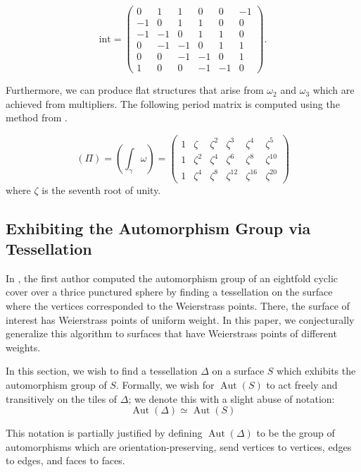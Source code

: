\documentclass[12pt,reqno]{amsart}
\DeclareMathOperator{\Aut}{Aut}
\theoremstyle{definition}
\theoremstyle{remark}
\begin{document}
$$\textrm{int} = \begin{pmatrix}
 0 & 1 & 1 & 0 & 0 & -1 \\
 -1 & 0 & 1 & 1 & 0 & 0 \\
 -1 & -1 & 0 & 1 & 1 & 0 \\
 0 & -1 & -1 & 0 & 1 & 1 \\
 0 & 0 & -1 & -1 & 0 & 1 \\
 1 & 0 & 0 & -1 & -1 & 0 
\end{pmatrix}.$$

Furthermore, we can produce flat structures that arise from $\omega_2$ and $\omega_3$ which are achieved from multipliers. The following period matrix is computed using the method from \cite{kw}.

 $$(\Pi) = (\int_{\gamma} \omega) = \begin{pmatrix}
  1 & \zeta  & \zeta^2 & \zeta^3 & \zeta^4 & \zeta^5 \\
 1 & \zeta^2 & \zeta^4 & \zeta^6 & \zeta^8 & \zeta^{10} \\
 1 & \zeta^4 & \zeta^8 & \zeta^{12} & \zeta^{16} & \zeta^{20} 
 \end{pmatrix}$$ where $\zeta$ is the seventh root of unity.


\subsection{Exhibiting the Automorphism Group via Tessellation}

\label{sec:flagflag}

In \cite{dami}, the first author computed the automorphism group of an eightfold cyclic cover over a thrice punctured sphere by finding a tessellation on the surface where the vertices corresponded to the Weierstrass points. There, the surface of interest has Weierstrass points of uniform weight. In this paper, we conjecturally generalize this algorithm to surfaces that have Weierstrass points of different weights. %

In this section, we wish to find a tessellation $\Delta$ on a surface $S$ which exhibits the automorphism group of $S$. Formally, we wish for $\Aut(S)$ to act freely and transitively on the tiles of $\Delta$; we denote this with a slight abuse of notation:
\vspace{-3pt}
$$\Aut(\Delta) \simeq \Aut(S)$$

This notation is partially justified by defining $\Aut(\Delta)$ to be the group of automorphisms which are orientation-preserving, send vertices to vertices, edges to edges, and faces to faces. 
\end{document}

